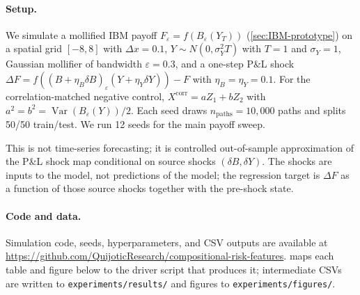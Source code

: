 \documentclass[11pt,reqno]{amsart}
\theoremstyle{plain}
\theoremstyle{definition}
\theoremstyle{remark}
\newcommand{\Bvar}{B}
\newcommand{\Yclock}{Y}
\DeclareMathOperator{\Var}{Var}
\begin{document}
\paragraph{Setup.}
We simulate a mollified IBM payoff
$F_{\varepsilon}=f(\Bvar_{\varepsilon}(\Yclock_{T}))$
(\cref{sec:IBM-prototype}) on a spatial grid $[-8,8]$ with
$\Delta x=0.1$, $\Yclock\sim N(0,\sigma_{Y}^{2}T)$ with $T=1$
and $\sigma_{Y}=1$, Gaussian mollifier of bandwidth
$\varepsilon=0.3$, and a one-step P\&L shock
$\Delta F=f((\Bvar+\eta_{B}\delta\Bvar)_{\varepsilon}(\Yclock+\eta_{Y}\delta\Yclock))-F$
with $\eta_{B}=\eta_{Y}=0.1$. For the correlation-matched
negative control, $X^{\mathrm{corr}}=aZ_{1}+bZ_{2}$ with
$a^{2}=b^{2}=\Var(\Bvar_{\varepsilon}(\Yclock))/2$. Each seed
draws $n_{\mathrm{paths}}=10{,}000$ paths and splits
50/50 train/test. We run 12 seeds for the main payoff sweep.

This is not time-series forecasting; it is controlled
out-of-sample approximation of the P\&L shock map conditional
on source shocks $(\delta\Bvar,\delta\Yclock)$. The shocks are
inputs to the model, not predictions of the model; the
regression target is $\Delta F$ as a function of those source
shocks together with the pre-shock state.

\paragraph{Code and data.}
Simulation code, seeds, hyperparameters, and CSV outputs are
available at
\url{https://github.com/QuijoticResearch/compositional-risk-features}.
 maps each table and figure below to the
driver script that produces it; intermediate CSVs are written to
\texttt{experiments/results/} and figures to
\texttt{experiments/figures/}.
\end{document}
